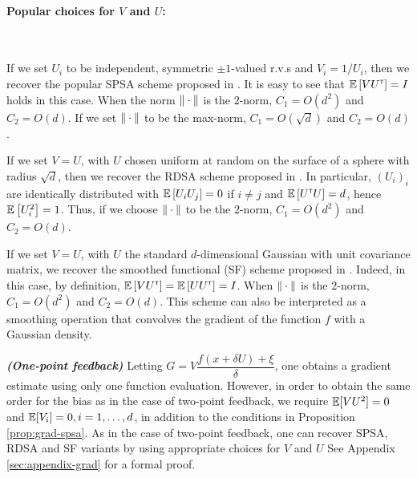 \paragraph{Popular choices for $V$ and $U$:}\ \\
\begin{inparaenum}[$\bullet$]
 \item If we set $U_i$ to be independent, symmetric $\pm 1$-valued r.v.s and $V_i = 1/U_i$, then we recover the popular SPSA scheme proposed in \cite{spall1992multivariate}.
It is easy to see that $\mathbb{E}\left[  V U^\mathsf{\scriptscriptstyle T} \right] = I$ holds in this case.
 When the norm $\|\cdot\|$ is the $2$-norm, $C_1 = O(d^2)$ and $C_2 = O(d)$. If we set $\|\cdot\|$ to be the max-norm, $C_1 = O(\sqrt{d})$ and $C_2 = O(d)$.\\
 \item If we set $V=U$, with $U$ chosen uniform at random on the surface of a sphere with radius $\sqrt{d}$, 
 then we recover the RDSA scheme proposed in \cite[pp.~58-60]{kushcla}. 
 In particular, $(U_i)_i$ are identically distributed with $\mathbb{E}\left[ U_i U_j \right] = 0$ if $i\ne j$ and $\mathbb{E}\left[ U^\mathsf{\scriptscriptstyle T} U \right] = d$, hence $\mathbb{E}\left[U_i^2\right] = 1$. Thus, if we choose $\|\cdot\|$ to be the $2$-norm, $C_1 = O( d^2 )$ and $C_2 = O(d)$.
 \\
 \item If we set $V=U$, with $U$ the standard $d$-dimensional Gaussian with unit covariance matrix, we recover the smoothed functional (SF) scheme proposed in \cite{katkul}. 
Indeed, in this case, by definition, $\mathbb{E}\left[VU^\mathsf{\scriptscriptstyle T}\right] = \mathbb{E}\left[U U^\mathsf{\scriptscriptstyle T} \right] = I$.
When $\|\cdot\|$ is the $2$-norm, $C_1 = O(d^2)$
 and $C_2 = O( d)$.
 This scheme can also be interpreted as a smoothing operation that  convolves the gradient of the function $f$ with a Gaussian density.
\end{inparaenum}

\begin{remark}\textbf{\textit{(One-point feedback)}}
 Letting $G =  V \dfrac{f(x+\delta U) + \xi}{\delta}$, one obtains a gradient estimate using only one function evaluation. However, in order to obtain the same order for the bias as in the case of two-point feedback, we require $\mathbb{E}[ V U^2] = 0$ and $\mathbb{E}[V_i]=0, i=1,\ldots,d$, in addition to the conditions in Proposition \ref{prop:grad-spsa}. 
 As in the case of two-point feedback, one can recover SPSA, RDSA and SF variants by using appropriate choices for $V$ and $U$ See Appendix \ref{sec:appendix-grad} for a formal proof.
\end{remark}

